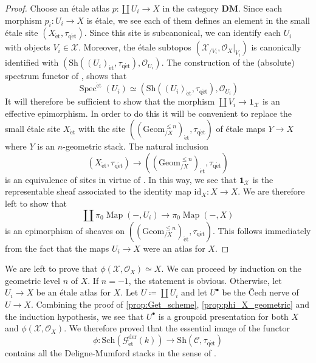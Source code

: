 \documentclass[12pt,a4paper,reqno]{amsart}
\theoremstyle{plain}
\theoremstyle{definition}
\theoremstyle{remark}
\numberwithin{equation}{section}
\begin{document}
\begin{proof}
	Choose an \'etale atlas $p \colon \coprod U_i \to X$ in the category $\mathbf{DM}$.
	Since each morphism $p_i \colon U_i \to X$ is \'etale, we see each of them defines an element in the small \'etale site $(X_{\mathrm{\acute{e}t}}, {\tau_\mathrm{q\acute{e}t}})$.
	Since this site is subcanonical, we can identify each $U_i$ with objects $V_i \in {\mathcal X}$.
	Moreover, the \'etale subtopos $({\mathcal X}_{/V_i}, {\mathcal O}_X |_{V_i})$ is canonically identified with $({\mathrm{Sh}}((U_i)_{\mathrm{\acute{e}t}}, {\tau_\mathrm{q\acute{e}t}}), {\mathcal O}_{U_i})$.
	The construction of the (absolute) spectrum functor of \cite[Â§2.2]{DAG-V}, shows that
	\[ \operatorname{Spec}^{\mathrm{\acute{e}t}}(U_i) \simeq ({\mathrm{Sh}}((U_i)_{\mathrm{\acute{e}t}}, {\tau_\mathrm{q\acute{e}t}}), {\mathcal O}_{U_i}) \]
	It will therefore be sufficient to show that the morphism $\coprod V_i \to \mathbf 1_{\mathcal X}$ is an effective epimorphism.
	In order to do this it will be convenient to replace the small \'etale site $X_{\mathrm{\acute{e}t}}$ with the site $((\mathrm{Geom}^{\le n}_{/X})_{\mathrm{\acute{e}t}}, {\tau_\mathrm{q\acute{e}t}})$ of \'etale maps $Y \to X$ where $Y$ is an $n$-geometric stack.
	The natural inclusion
	\[ (X_{\mathrm{\acute{e}t}}, {\tau_\mathrm{q\acute{e}t}}) \to ((\mathrm{Geom}^{\le n}_{/X})_{\mathrm{\acute{e}t}}, {\tau_\mathrm{q\acute{e}t}}) \]
	is an equivalence of sites in virtue of \cite[Lemma 2.34]{Porta_Yu_Higher_analytic_stacks_2014}.
	{\ignorespaces}
	In this way, we see that $\mathbf 1_{\mathcal X}$ is the representable sheaf associated to the identity map $\mathrm{id}_X \colon X \to X$.
	We are therefore left to show that
	\[ \coprod \pi_0 \operatorname{Map}(-, U_i) \to \pi_0 \operatorname{Map}(-, X) \]
	is an epimorphism of sheaves on $((\mathrm{Geom}^{\le n}_{/X})_{\mathrm{\acute{e}t}}, {\tau_\mathrm{q\acute{e}t}})$.
	This follows immediately from the fact that the maps $U_i \to X$ were an atlas for $X$.
\end{proof}

We are left to prove that $\phi({\mathcal X}, {\mathcal O}_X) \simeq X$.
We can proceed by induction on the geometric level $n$ of $X$.
If $n = -1$, the statement is obvious.
Otherwise, let $U_i \to X$ be an \'etale atlas for $X$.
Let $U \coloneqq \coprod U_i$ and let $U^\bullet$ be the \v{C}ech nerve of $U \to X$.
Combining the proof of \cref{prop:Get_scheme}, \cref{prop:phi_X_geometric} and the induction hypothesis, we see that $U^\bullet$ is a groupoid presentation for both $X$ and $\phi({\mathcal X}, {\mathcal O}_X)$.
We therefore proved that the essential image of the functor
\[ \phi \colon \mathrm{Sch}({{\mathcal G}_{\mathrm{\acute{e}t}}^\mathrm{der}(k)}) \to {\mathrm{Sh}}({\mathcal C}, {\tau_\mathrm{q\acute{e}t}}) \]
contains all the {Deligne-Mumford\xspace} stacks in the sense of \cite{HAG-II}.
\end{document}
